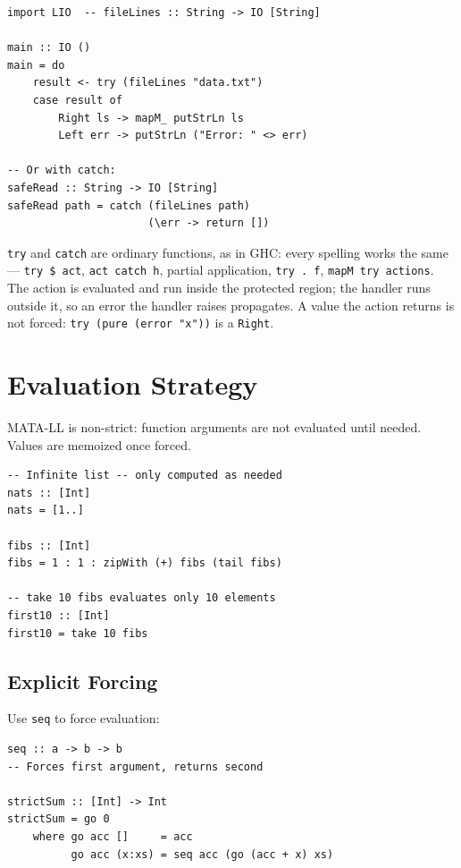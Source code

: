 \documentclass[11pt,a4paper]{article}
\begin{document}
\begin{lstlisting}
import LIO  -- fileLines :: String -> IO [String]

main :: IO ()
main = do
    result <- try (fileLines "data.txt")
    case result of
        Right ls -> mapM_ putStrLn ls
        Left err -> putStrLn ("Error: " <> err)

-- Or with catch:
safeRead :: String -> IO [String]
safeRead path = catch (fileLines path)
                      (\err -> return [])
\end{lstlisting}

\texttt{try} and \texttt{catch} are ordinary functions, as in GHC: every
spelling works the same --- \texttt{try \$ act}, \texttt{act \textasciigrave{}catch\textasciigrave{} h},
partial application, \texttt{try . f}, \texttt{mapM try actions}. The action
is evaluated and run inside the protected region; the handler runs outside
it, so an error the handler raises propagates. A value the action returns
is not forced: \texttt{try (pure (error "x"))} is a \texttt{Right}.

\section{Evaluation Strategy}

MATA-LL is non-strict: function arguments are not evaluated until needed.
Values are memoized once forced.

\begin{lstlisting}
-- Infinite list -- only computed as needed
nats :: [Int]
nats = [1..]

fibs :: [Int]
fibs = 1 : 1 : zipWith (+) fibs (tail fibs)

-- take 10 fibs evaluates only 10 elements
first10 :: [Int]
first10 = take 10 fibs
\end{lstlisting}

\subsection{Explicit Forcing}

Use \texttt{seq} to force evaluation:

\begin{lstlisting}
seq :: a -> b -> b
-- Forces first argument, returns second

strictSum :: [Int] -> Int
strictSum = go 0
    where go acc []     = acc
          go acc (x:xs) = seq acc (go (acc + x) xs)
\end{lstlisting}
\end{document}

